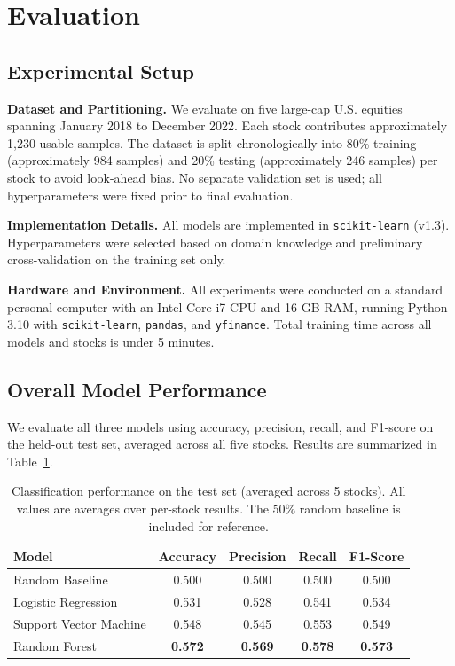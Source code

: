 \documentclass{article}
\begin{document}
\section{Evaluation}

\subsection{Experimental Setup}

\textbf{Dataset and Partitioning.} We evaluate on five large-cap U.S. equities
spanning January 2018 to December 2022. Each stock contributes approximately
1,230 usable samples. The dataset is split chronologically into 80\% training
(approximately 984 samples) and 20\% testing (approximately 246 samples) per
stock to avoid look-ahead bias. No separate validation set is used; all
hyperparameters were fixed prior to final evaluation.

\textbf{Implementation Details.} All models are implemented in
\texttt{scikit-learn} (v1.3). Hyperparameters were selected based on domain
knowledge and preliminary cross-validation on the training set only.

\textbf{Hardware and Environment.} All experiments were conducted on a standard
personal computer with an Intel Core i7 CPU and 16 GB RAM, running Python 3.10
with \texttt{scikit-learn}, \texttt{pandas}, and \texttt{yfinance}. Total
training time across all models and stocks is under 5 minutes.

\subsection{Overall Model Performance}

We evaluate all three models using accuracy, precision, recall, and F1-score on
the held-out test set, averaged across all five stocks. Results are summarized
in Table~\ref{tab:results}.

\begin{table}[ht]
\centering
\caption{Classification performance on the test set (averaged across 5 stocks).
All values are averages over per-stock results. The 50\% random baseline is
included for reference.}
\label{tab:results}
\begin{tabular}{lcccc}
\toprule
\textbf{Model} & \textbf{Accuracy} & \textbf{Precision} & \textbf{Recall} & \textbf{F1-Score} \\
\midrule
Random Baseline        & 0.500 & 0.500 & 0.500 & 0.500 \\
\midrule
Logistic Regression    & 0.531 & 0.528 & 0.541 & 0.534 \\
Support Vector Machine & 0.548 & 0.545 & 0.553 & 0.549 \\
Random Forest          & \textbf{0.572} & \textbf{0.569} & \textbf{0.578} & \textbf{0.573} \\
\bottomrule
\end{tabular}
\end{table}
\end{document}
